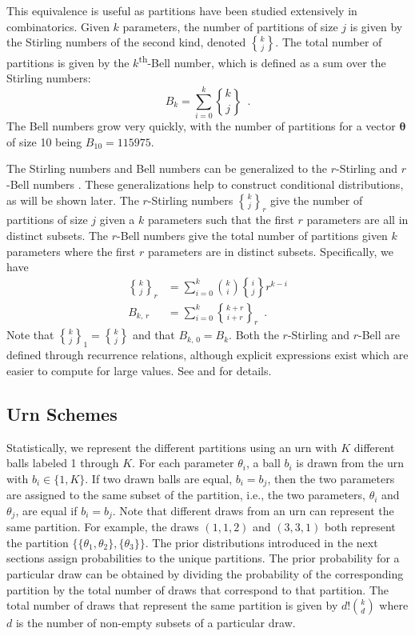 \documentclass[11pt,a4paper]{article}
\theoremstyle{definition} %
\theoremstyle{case}
\DeclareRobustCommand{\stirling}{\genfrac\{\}{0pt}{}}
\newcommand{\rstirling}[3]{\stirling{#1}{#2}_{#3}}
\newcommand{\bellnum}[1]{B_{#1}}
\newcommand{\rbellnum}[2]{B_{#1,\,#2}}
\begin{document}
This equivalence is useful as partitions have been studied extensively in combinatorics. Given $k$ parameters, the number of partitions of size $j$ is given by the Stirling numbers of the second kind, denoted $\stirling{k}{j}$. The total number of partitions is given by the $k$\textsuperscript{th}-Bell number, which is defined as a sum over the Stirling numbers:
\begin{equation}
    \bellnum{k} = \sum_{i = 0}^k \stirling{k}{j} \enspace .
\end{equation}
The Bell numbers grow very quickly, with the number of partitions for a vector $\mathbf{\theta}$ of size 10 being $B_{10} =115975$. %

The Stirling numbers and Bell numbers can be generalized to the $r$-Stirling \parencite{broder1984r} and $r$-Bell numbers \parencite{mezo2011r}. These generalizations help to construct conditional distributions, as will be shown later. The $r$-Stirling numbers $\rstirling{k}{j}{r}$ give the number of partitions of size $j$ given a $k$ parameters such that the first $r$ parameters are all in distinct subsets. The $r$-Bell numbers give the total number of partitions given $k$ parameters where the first $r$ parameters are in distinct subsets. Specifically, we have
\begin{align}
    \rstirling{k}{j}{r} &= \sum_{i=0}^k \binom{k}{i}\stirling{i}{j}r^{k-i}\\
    \rbellnum{k}{r} &= \sum_{i=0}^k \rstirling{k+r}{i+r}{r} \enspace .
\end{align}
Note that $\rstirling{k}{j}{1} = \stirling{k}{j}$ and that $\rbellnum{k}{0} = \bellnum{k}$. Both the $r$-Stirling and $r$-Bell are defined through recurrence relations, although explicit expressions exist which are easier to compute for large values. See \textcite{broder1984r} and \textcite{mezo2011r} for details.

\subsection{Urn Schemes}
Statistically, we represent the different partitions using an urn with $K$ different balls labeled 1 through $K$. For each parameter $\theta_i$, a ball $b_i$ is drawn from the urn with $b_i \in \{1,K\}$. If two drawn balls are equal, $b_i = b_j$, then the two parameters are assigned to the same subset of the partition, i.e., the two parameters, $\theta_i$ and $\theta_j$, are equal if $b_i = b_j$. Note that different draws from an urn can represent the same partition. For example, the draws $(1, 1, 2)$ and $(3, 3, 1)$ both represent the partition $\{\{\theta_1, \theta_2\}, \{\theta_3\}\}$. The prior distributions introduced in the next sections assign probabilities to the unique partitions. The prior probability for a particular draw can be obtained by dividing the probability of the corresponding partition by the total number of draws that correspond to that partition. The total number of draws that represent the same partition is given by $d!\binom{k}{d}$ where $d$ is the number of non-empty subsets of a particular draw. 
\end{document}
